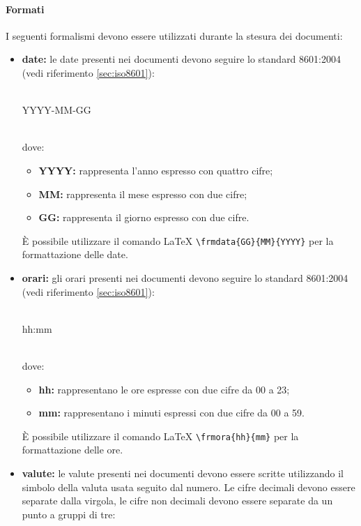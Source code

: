                 \paragraph{Formati}\label{sec:formati}
                I seguenti formalismi devono essere utilizzati durante la stesura dei documenti:
                \begin{itemize}
                    \item \textbf{date:} le date presenti nei documenti devono seguire lo standard  8601:2004 (vedi riferimento \ref{sec:iso8601}):\\\\
                    \centerline{YYYY-MM-GG}\\
                    dove:
                    \begin{itemize}
                        \item \textbf{YYYY:} rappresenta l'anno espresso con quattro cifre;
                        \item \textbf{MM:} rappresenta il mese espresso con due cifre;
                        \item \textbf{GG:} rappresenta il giorno espresso con due cifre.
                    \end{itemize}
                    È possibile utilizzare il comando \LaTeX{} \texttt{\textbackslash frmdata\{GG\}\{MM\}\{YYYY\}} per la formattazione delle date.
                    \item \textbf{orari:} gli orari presenti nei documenti devono seguire lo standard  8601:2004 (vedi riferimento \ref{sec:iso8601}):\\\\
                    \centerline{hh:mm}\\
                    dove:
                    \begin{itemize}
                        \item \textbf{hh:} rappresentano le ore espresse con due cifre da 00 a 23;
                        \item \textbf{mm:} rappresentano i minuti espressi con due cifre da 00 a 59.
                    \end{itemize}
                    È possibile utilizzare il comando \LaTeX{} \texttt{\textbackslash frmora\{hh\}\{mm\}} per la formattazione delle ore.
                    \item \textbf{valute:} le valute presenti nei documenti devono essere scritte utilizzando il simbolo della valuta usata seguito dal numero. Le cifre decimali devono essere separate dalla virgola, le cifre non decimali devono essere separate da un punto a gruppi di tre:

\end{itemize}
